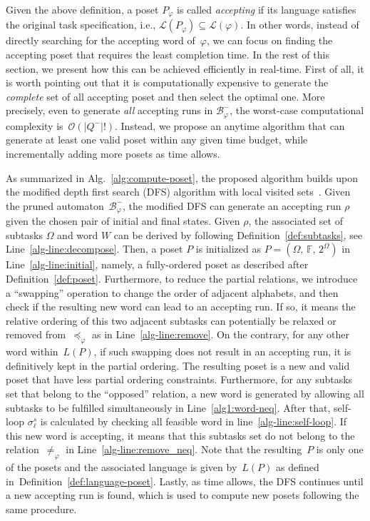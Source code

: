 Given the above definition, a poset $P_\varphi$ is called \emph{accepting}
if its language satisfies the original task specification, i.e.,
$\mathcal{L}(P_\varphi)\subseteq \mathcal{L}(\varphi)$.
In other words, instead of directly searching for the accepting word of~$\varphi$,
we can focus on finding the accepting poset that
requires the least completion time.
In the rest of this section, we present how this can be achieved efficiently
in real-time.
First of all, it is worth pointing out that it is computationally expensive to
generate the \emph{complete} set of all accepting poset
and then select the optimal one.
More precisely, even to generate \emph{all} accepting runs in $\mathcal{B}_{\varphi}^-$,
the worst-case computational complexity is~$\mathcal{O}(|Q^-|!)$.
Instead, we propose an anytime algorithm that can generate at least one
valid poset within any given time budget,
while incrementally adding more posets as time allows.


As summarized in Alg.~\ref{alg:compute-poset},
the proposed algorithm builds upon the modified depth first search (DFS)
algorithm with local visited sets~\cite{sedgewick2001algorithms}.
Given the pruned automaton~$\mathcal{B}_{\varphi}^-$,
the modified DFS can generate an accepting run $\rho$ given the chosen pair of
initial and final states.
Given $\rho$, the associated set of subtasks $\Omega$ and word $W$ can be
derived by following Definition~\ref{def:subtasks}, see Line~\ref{alg-line:decompose}.
Then, a poset $P$ is initialized as $P=(\Omega,\, \mathbb{F},\, 2^{\Omega})$
in Line~\ref{alg-line:initial},
namely, a fully-ordered poset as described after Definition~\ref{def:poset}.
Furthermore, to reduce the partial relations,
we introduce a ``swapping'' operation to change the order of adjacent alphabets,
and then check if the resulting new word can lead to an accepting run.
If so, it means the relative ordering of this two adjacent subtasks can
potentially be relaxed or removed from~$\preceq_{\varphi}$ as in Line~\ref{alg-line:remove}.
On the contrary, for any other word within~$L(P)$, if such swapping does not
result in an accepting run, it is definitively kept in the partial ordering.
The resulting poset is a new and valid poset that have less partial
ordering constraints.
Furthermore, for any subtasks set that belong to the ``opposed'' relation,
a new word is generated by allowing all subtasks to be fulfilled simultaneously
in Line~\ref{alg1:word-neq}. After that, self-loop $\sigma^s_\ell$ is calculated
by checking all feasible word in line~\ref{alg-line:self-loop}.
If this new word is accepting, it means that this subtasks set do not belong to the
relation~$\neq_{\varphi}$ in Line~\ref{alg-line:remove_neq}.
Note that the resulting~$P$ is only one of the posets and the associated language is
given by~$L(P)$ as defined in~Definition~\ref{def:language-poset}.
Lastly, as time allows, the DFS continues until a new accepting run is found,
which is used to compute new posets following the same procedure.

